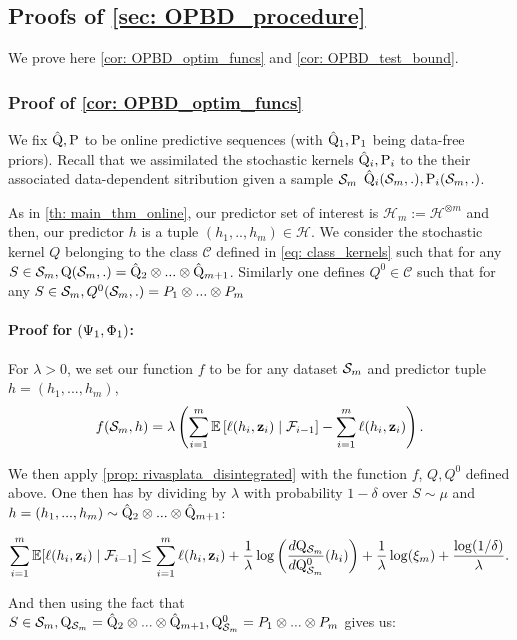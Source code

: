 \subsection{Proofs of \cref{sec: OPBD_procedure}}
\label{sec: proofs_sec4}
We prove here \cref{cor: OPBD_optim_funcs} and \cref{cor: OPBD_test_bound}.

\subsubsection{Proof of \cref{cor: OPBD_optim_funcs}}
We fix $\hat{\mathrm{Q}},\mathrm{P}$ to be online predictive sequences (with $\hat{\mathrm{Q}}_1,\mathrm{P}_1$ being data-free priors). Recall that we assimilated the stochastic kernels $\hat{\mathrm{Q}}_i,\mathrm{P}_{i}$ to the their associated data-dependent sitribution given a sample $\mathcal{S}_m$ $\hat{\mathrm{Q}}_i(\mathcal{S}_m,.), \mathrm{P}_{i}(\mathcal{S}_m,.)$.

As in \cref{th: main_thm_online}, our predictor set of interest is $\mathcal{H}_m:= \mathcal{H}^{\otimes m}$ and then, our predictor $h$ is a tuple $(h_1,..,h_m)\in\mathcal{H}$. We consider the stochastic kernel $Q$ belonging to the class $\mathcal{C}$ defined in \cref{eq: class_kernels} such that for any $S\in\mathcal{S}_m, \mathrm{Q}(\mathcal{S}_m,.) = \hat{\mathrm{Q}}_2\otimes ... \otimes \hat{\mathrm{Q}}_{m+1}$.
Similarly one defines $Q^0\in\mathcal{C}$ such that for any $S\in\mathcal{S}_m, Q^0(\mathcal{S}_m,.) = P_1\otimes ... \otimes P_{m}$




\paragraph{Proof for $(\Psi_{\normalfont1},\Phi_{\normalfont1})$:}

For $\lambda>0$, we set our function $f$ to be for any dataset $\mathcal{S}_m$ and predictor tuple $h=(h_1,...,h_m)$,
\[f(\mathcal{S}_m,h) = \lambda \left(\sum_{i=1}^m \mathbb{E}\left[\ell(h_i,\mathbf{z}_i)\mid \mathcal{F}_{i-1}\right]- \sum_{i=1}^m \ell(h_i,\mathbf{z}_i) \right).\]

We then apply \cref{prop: rivasplata_disintegrated} with the function $f$, $Q,Q^0$ defined above. One then has by dividing by $\lambda$ with probability $1-\delta$ over $S\sim \mu$ and $h=(h_1,...,h_m)\sim \hat{\mathrm{Q}}_2\otimes ... \otimes \hat{\mathrm{Q}}_{m+1}$:

\[ \sum_{i=1}^m  \mathbb{E}[\ell(h_i,\mathbf{z}_i) \mid \mathcal{F}_{i-1}]   \leq \sum_{i=1}^m  \ell(h_i,\mathbf{z}_i)  + \frac{1}{\lambda}\log\left(\frac{d\mathrm{Q}_{\mathcal{S}_m}}{d\mathrm{Q}_{\mathcal{S}_m}^0}(h_i)\right) + \frac{1}{\lambda} \log(\xi_m) + \frac{\log(1/\delta)}{\lambda}. \]

And then using the fact that $S\in\mathcal{S}_m, \mathrm{Q}_{\mathcal{S}_m} = \hat{\mathrm{Q}}_2\otimes ... \otimes \hat{\mathrm{Q}}_{m+1}, \mathrm{Q}_{\mathcal{S}_m}^0 = P_1\otimes ... \otimes P_{m}$ gives us:


